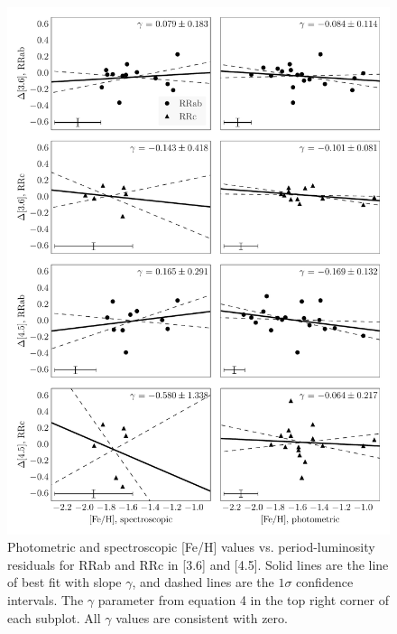 \documentclass[a4paper,fleqn,usenatbib]{mnras}
\begin{document}
\begin{figure}
\begin{center}
\includegraphics[width=160mm]{reworked_fitting_code/final_plots/metallicity_vs_residuals_m4_split.pdf}
\caption{Photometric \citep{2000AJ....119.1824R} and spectroscopic \citep{2006ApJ...640L..43S} [Fe/H] values vs. period-luminosity residuals for RRab and RRc in [3.6] and [4.5]. Solid lines are the line of best fit with slope $\gamma$, and dashed lines are the $1\sigma$ confidence intervals. The $\gamma$ parameter from equation 4 in the top right corner of each subplot. All $\gamma$ values are consistent with zero.}
\label{fig:metallicity_residuals}
\end{center}
\end{figure}



\end{document}
